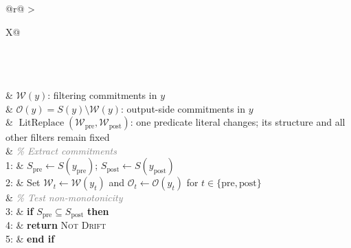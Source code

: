 
\begin{algorithm}[t]

\caption{User Intent Drift Operationalization}
\label{alg:drift-test}
\small
\renewcommand{\arraystretch}{1.10}

\begin{tabularx}{\linewidth}{
    @{}r@{\hspace{0.75em}}
    >{\raggedright\arraybackslash}X@{}
}

 \\

 \\[2pt]

 \\[0pt]

&
$\mathcal{W}(y)$: filtering commitments in $y$
\\

&
$\mathcal{O}(y)=S(y)\setminus\mathcal{W}(y)$:
output-side commitments in $y$
\\

&
$\operatorname{LitReplace}
(\mathcal{W}_{\mathrm{pre}},\mathcal{W}_{\mathrm{post}})$:
one predicate literal changes; its structure and all other filters
remain fixed
\\[2pt]

&
\textcolor{gray}{\itshape\% Extract commitments}
\\[0pt]

1: &
$S_{\mathrm{pre}}\gets S(y_{\mathrm{pre}})$;
$S_{\mathrm{post}}\gets S(y_{\mathrm{post}})$
\\

2: &
Set $\mathcal{W}_t\gets\mathcal{W}(y_t)$ and
$\mathcal{O}_t\gets\mathcal{O}(y_t)$ for
$t\in\{\mathrm{pre},\mathrm{post}\}$
\\[2pt]

&
\textcolor{gray}{\itshape\% Test non-monotonicity}
\\[0pt]

3: &
\textbf{if} $S_{\mathrm{pre}}\subseteq S_{\mathrm{post}}$
\textbf{then}
\\

4: &
\hspace*{1.2em}\textbf{return} \textsc{Not Drift}
\\

5: &
\textbf{end if}
\\[2pt]


\end{tabularx}
\end{algorithm}
